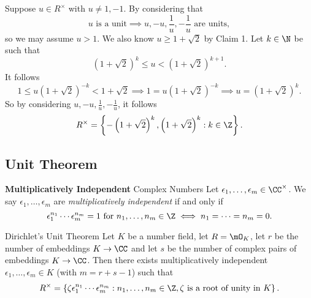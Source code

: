 \documentclass[pmath441]{subfiles}
\begin{document}
\begin{answer}
        Suppose $u\in R^\times$ with $u\neq 1, -1$. By considering that
        \begin{equation*}
            u \text{ is a unit} \implies u,-u,\frac{1}{u},-\frac{1}{u}\text{ are units},
        \end{equation*}
        so we may assume $u>1$. We also know $u\geq 1+\sqrt{2}$ by Claim 1. Let $k\in\N$ be such that
        \begin{equation*}
            \left( 1+\sqrt{2} \right)^k \leq u < \left( 1+\sqrt{2} \right)^{k+1}.
        \end{equation*}
        It follows
        \begin{equation*}
            1 \leq u\left( 1+\sqrt{2} \right)^{-k} < 1+\sqrt{2} \implies 1 = u\left( 1+\sqrt{2} \right)^{-k} \implies u = \left( 1+\sqrt{2} \right)^k.
        \end{equation*}
        So by considering $u,-u,\frac{1}{u},-\frac{1}{u}$, it follows
        \begin{equation*}
            R^\times = \left\lbrace -\left( 1+\sqrt{2} \right)^k, \left( 1+\sqrt{2} \right)^k: k\in\Z \right\rbrace.
        \end{equation*}
    \end{answer}
    
    \subsection{Unit Theorem}

    \begin{definition}{\textbf{Multiplicatively Independent} Complex Numbers}
        Let $\epsilon_1,\ldots,\epsilon_m\in\CC^\times$. We say $\epsilon_1,\ldots,\epsilon_m$ are \emph{multiplicatively independent} if and only if
        \begin{equation*}
            \epsilon_1^{n_1}\cdots\epsilon_m^{n_m} = 1 \text{ for $n_1,\ldots,n_m\in\Z$} \iff n_1=\cdots=n_m=0.
        \end{equation*}
    \end{definition}

    \clearpage
    
    \begin{theorem}{Dirichlet's Unit Theorem}
        Let $K$ be a number field, let $R=\mO_K$, let $r$ be the number of embeddings $K\to\CC$ and let $s$ be the number of complex pairs of embeddings $K\to\CC$. Then there exists multiplicatively independent $\epsilon_1,\ldots,\epsilon_m\in K$ (with $m=r+s-1$) such that
        \begin{equation*}
            R^\times = \left\lbrace \zeta\epsilon_1^{n_1}\cdots\epsilon_m^{n_m}: n_1,\ldots,n_m\in\Z, \zeta\text{ is a root of unity in $K$} \right\rbrace.
        \end{equation*}
    \end{theorem}
    
\end{document}
